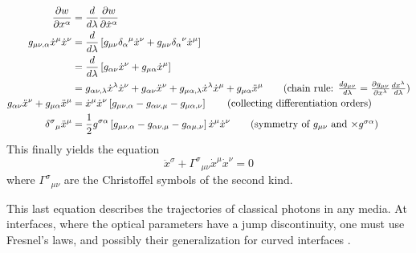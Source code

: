   \begin{align*}
  \frac{\partial w}{\partial x^\alpha}			&= \frac{d}{d\lambda}\frac{\partial w}{\partial\dot{x}^\alpha}	\\
  g_{\mu\nu,\alpha}\dot{x}^\mu\dot{x}^\nu		&= \frac{d}{d\lambda}\left[g_{\mu\nu}{\delta_\alpha}^\mu\dot{x}^\nu+g_{\mu\nu}{\delta_\alpha}^\nu\dot{x}^\mu\right]	\\
							&= \frac{d}{d\lambda}\left[g_{\alpha\nu}\dot{x}^\nu+g_{\mu\alpha}\dot{x}^\mu\right]					\\
							&= g_{\alpha\nu,\lambda}\dot{x}^\lambda\dot{x}^\nu+g_{\alpha\nu}\ddot{x}^\nu+g_{\mu\alpha,\lambda}\dot{x}^\lambda\dot{x}^\mu+g_{\mu\alpha}\ddot{x}^\mu \tag{chain rule: $\frac{dg_{\mu\nu}}{d\lambda}=\frac{\partial g_{\mu\nu}}{\partial x^\lambda}\frac{dx^\lambda}{d\lambda}$}	\\
  g_{\alpha\nu}\ddot{x}^\nu+g_{\mu\alpha}\ddot{x}^\mu	&= \dot{x}^\mu\dot{x}^\nu\left[g_{\mu\nu,\alpha}-g_{\alpha\nu,\mu}-g_{\mu\alpha,\nu}\right]	\tag{collecting differentiation orders}	\\
  {\delta^\sigma}_\mu\ddot{x}^\mu			&= \frac{1}{2}g^{\sigma\alpha}\left[g_{\mu\nu,\alpha}-g_{\alpha\nu,\mu}-g_{\alpha\mu,\nu}\right]\dot{x}^\mu\dot{x}^\nu	\tag{symmetry of $g_{\mu\nu}$ and $\times g^{\sigma\alpha}$}
  \end{align*}
This finally yields the equation
  \begin{equation}
   \ddot{x}^\sigma + {\Gamma^\sigma}_{\mu\nu}\dot{x}^\mu\dot{x}^\nu=0
  \end{equation}
where ${\Gamma^\sigma}_{\mu\nu}$ are the Christoffel symbols of the second kind. 

This last equation describes the trajectories of classical photons in any media. 
At interfaces, where the optical parameters have a jump discontinuity, one must use
Fresnel's laws, and possibly their generalization for curved interfaces \cite{HEN2002}.

